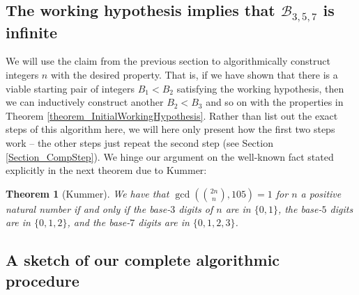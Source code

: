 \documentclass[12pt]{article}
\newtheorem{theorem}{Theorem}
\begin{document}
\subsection{The working hypothesis implies that $\mathcal{B}_{3,5,7}$ is infinite}

We will use the claim from the previous section to algorithmically construct
integers $n$ with the desired property.  That is, if we have shown that there is a viable 
starting pair of integers $B_1 < B_2$ satisfying the working hypothesis, then we can inductively 
construct another $B_2 < B_3$ and so on with the properties in 
Theorem \ref{theorem_InitialWorkingHypothesis}. 
Rather than list out the exact
steps of this algorithm here, we will here only present how the first two 
steps work -- the other steps just repeat the second step (see Section \ref{Section_CompStep}).
We hinge our argument on the well-known fact stated explicitly in the next theorem due to Kummer:

\begin{theorem}[Kummer]
We have that $\gcd({2n \choose n},105) = 1$ for $n$ a positive natural number if and
only if the base-$3$ digits of $n$ are in $\{0,1\}$,
the base-$5$ digits are in $\{0,1,2\}$, and the base-$7$ digits are in 
$\{0,1,2,3\}$.
\end{theorem} 

\subsection{A sketch of our complete algorithmic procedure} 
\end{document}
